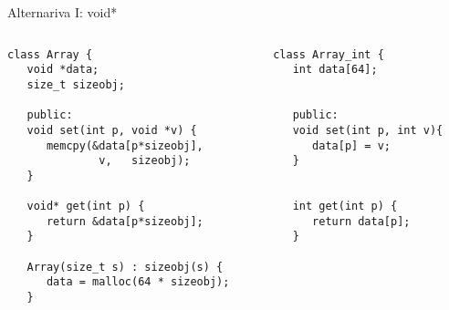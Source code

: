 \begin{frame}{Alternariva I: void*}
   \begin{columns}[t]
      \begin{column}{.55\linewidth}
         \begin{lstlisting}[style=normal,linebackgroundcolor={%
               \only<1>{\def\lst@linebgrdcmd####1####2####3{}}%
               \btLstHLB<2>{7-8}% memcpy, copia bit a bit
               \btLstHLB<3>{12}% casteo!
         }]
class Array {
   void *data;    
   size_t sizeobj;

   public:
   void set(int p, void *v) {
      memcpy(&data[p*sizeobj], 
              v,   sizeobj);
   }

   void* get(int p) {
      return &data[p*sizeobj];
   }

   Array(size_t s) : sizeobj(s) {
      data = malloc(64 * sizeobj);
   }
         \end{lstlisting}
      \end{column}
      \begin{column}{.40\linewidth}
         \begin{lstlisting}[style=normalnonumbers]
class Array_int {
   int data[64];


   public:
   void set(int p, int v){
      data[p] = v;
   }


   int get(int p) {
      return data[p];
   }

         \end{lstlisting}
      \end{column}
   \end{columns}
\end{frame}

